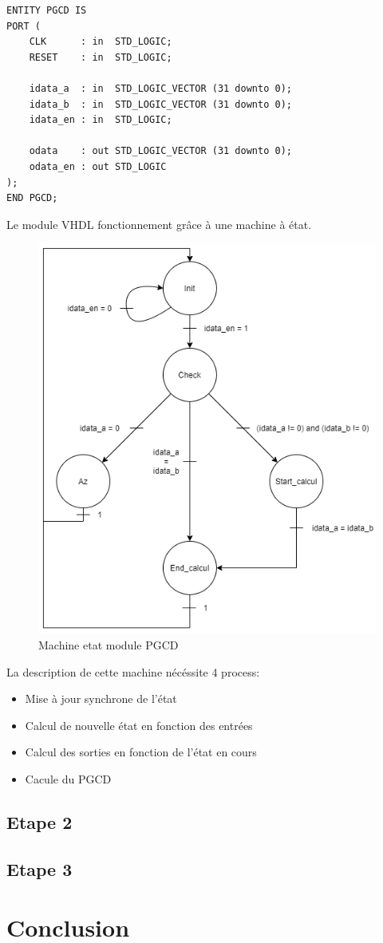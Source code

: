 \documentclass[a4paper]{article}
\begin{document}
\begin{lstlisting}[style=VHDL]
ENTITY PGCD IS
PORT ( 
    CLK      : in  STD_LOGIC;
    RESET    : in  STD_LOGIC;

    idata_a  : in  STD_LOGIC_VECTOR (31 downto 0);
    idata_b  : in  STD_LOGIC_VECTOR (31 downto 0);
    idata_en : in  STD_LOGIC;

    odata    : out STD_LOGIC_VECTOR (31 downto 0);
    odata_en : out STD_LOGIC
);
END PGCD;  
\end{lstlisting}
        Le module VHDL fonctionnement grâce à une machine à état.
\begin{figure}[H]
    \centering
    \includegraphics[scale=0.5]{Pictures/FSM_PGCD.png}
    \caption{Machine etat module PGCD}
    \label{fig:FSM_PGCD}
\end{figure}
        La description de cette machine nécéssite 4 process:
        \begin{itemize}
            \item Mise à jour synchrone de l'état
            \item Calcul de nouvelle état en fonction des entrées
            \item Calcul des sorties en fonction de l'état en cours
            \item Cacule du PGCD
        \end{itemize}
    \subsection{Etape 2}
    \subsection{Etape 3}

\section{Conclusion} %
\begin{lstlisting}[style=CStyle]
    
\end{lstlisting}

\newpage %
\listoftodos
\end{document}

